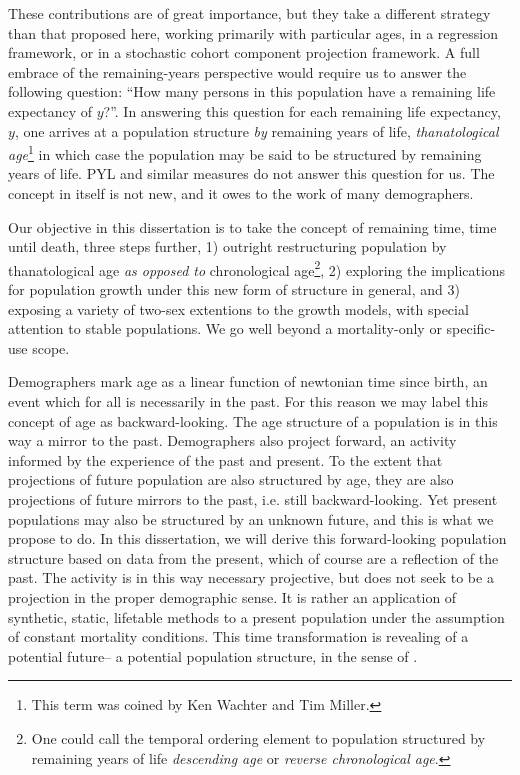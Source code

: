  These contributions are of great importance, but they take a different 
 strategy than that proposed here, working primarily with particular ages, in a 
 regression framework, or in a stochastic cohort component projection framework.
  A full embrace of the remaining-years perspective would require us to answer
 the following question: ``How many persons in this population have a remaining
 life expectancy of $y$?''. In answering this question for each remaining life
 expectancy, $y$, one arrives at a population structure \textit{by} remaining
 years of life, \textit{thanatological age}\footnote{This term was coined by
 Ken Wachter and Tim Miller.} in which case the population may be said to be
 structured by remaining years of life. PYL and similar measures do not answer this question for us. The concept in itself is not new, and it owes to the work of 
 many demographers. 
 
 Our objective in this dissertation is to take the concept of
 remaining time, time until death, three steps further, 1) outright
 restructuring population by thanatological age \textit{as opposed to}
 chronological age\footnote{One could call the temporal ordering element to
 population structured by remaining years of life \textit{descending age} or
 \textit{reverse chronological age}.}, 2) exploring the implications for
 population growth under this new form of structure in general, and 3) exposing 
 a variety of two-sex extentions to the growth models, with special attention 
 to stable populations. We go well beyond a mortality-only or specific-use scope.

Demographers mark age as a linear function of newtonian time since
birth, an event which for all is necessarily in the past. For this reason we may
label this concept of age as backward-looking. The age structure of a population
is in this way a mirror to the past. Demographers also project forward, an activity 
informed by the experience of the past and present. To the
extent that projections of future population are also structured by age,
they are also projections of future mirrors to the past, i.e. still
backward-looking. Yet present populations may also be structured by an unknown
future, and this is what we propose to do. In this dissertation, we will derive
this forward-looking population structure based on data from the present, which of course are a reflection 
of the past. The activity is in this way necessary projective, but does not 
seek to be a projection in the proper demographic sense. It is rather an
application of synthetic, static, lifetable methods to a present population
under the assumption of constant mortality conditions. This time transformation
is revealing of a potential future-- a potential population structure, in the 
sense of \citet{hersch1944demographie}.


